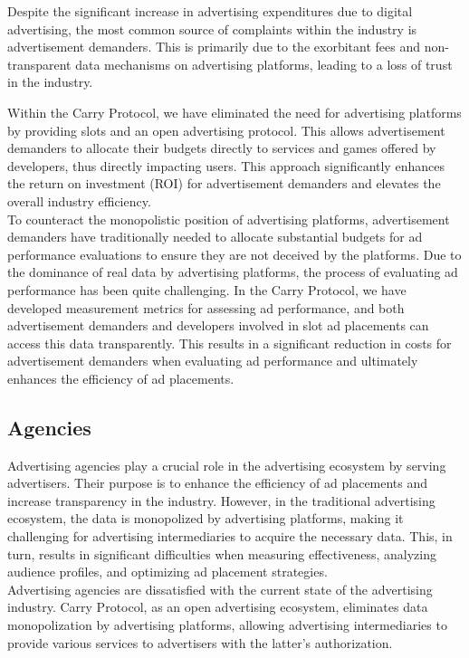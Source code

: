 Despite the significant increase in advertising expenditures due to digital advertising, the most common source of complaints within the industry is advertisement demanders. This is primarily due to the exorbitant fees and non-transparent data mechanisms on advertising platforms, leading to a loss of trust in the industry.

Within the Carry Protocol, we have eliminated the need for advertising platforms by providing slots and an open advertising protocol. This allows advertisement demanders to allocate their budgets directly to services and games offered by developers, thus directly impacting users. This approach significantly enhances the return on investment (ROI) for advertisement demanders and elevates the overall industry efficiency.\\

To counteract the monopolistic position of advertising platforms, advertisement demanders have traditionally needed to allocate substantial budgets for ad performance evaluations to ensure they are not deceived by the platforms. Due to the dominance of real data by advertising platforms, the process of evaluating ad performance has been quite challenging. In the Carry Protocol, we have developed measurement metrics for assessing ad performance, and both advertisement demanders and developers involved in slot ad placements can access this data transparently. This results in a significant reduction in costs for advertisement demanders when evaluating ad performance and ultimately enhances the efficiency of ad placements.



\subsection{Agencies}

Advertising agencies play a crucial role in the advertising ecosystem by serving advertisers. Their purpose is to enhance the efficiency of ad placements and increase transparency in the industry. However, in the traditional advertising ecosystem, the data is monopolized by advertising platforms, making it challenging for advertising intermediaries to acquire the necessary data. This, in turn, results in significant difficulties when measuring effectiveness, analyzing audience profiles, and optimizing ad placement strategies.\\

Advertising agencies are dissatisfied with the current state of the advertising industry. Carry Protocol, as an open advertising ecosystem, eliminates data monopolization by advertising platforms, allowing advertising intermediaries to provide various services to advertisers with the latter's authorization.\\

